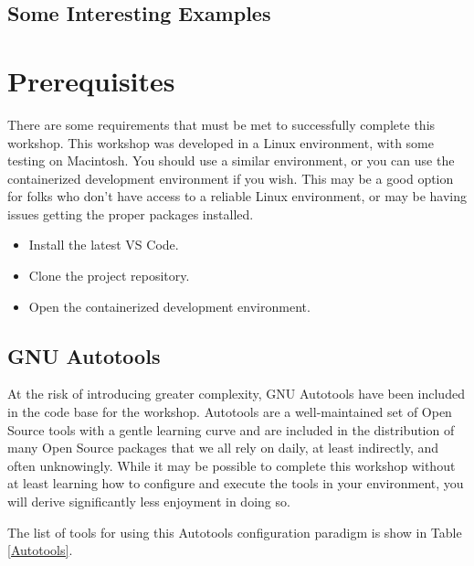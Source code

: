 \subsection{\label{sec:interesting}Some Interesting Examples}

\section{\label{sec:preparation}Prerequisites}

\justifying
There are some requirements that must be met to successfully complete this workshop. This workshop was developed in a Linux environment, with some testing on Macintosh. You should use a similar environment, or you can use the containerized development environment if you wish. This may be a good option for folks who don't have access to a reliable Linux environment, or may be having issues getting the proper packages installed.

\begin{raggedright}
	\begin{itemize}
		\item Install the latest VS Code.
		\item Clone the project repository.
		\item Open the containerized development environment.
	\end{itemize}
\end{raggedright}
\vspace{2mm}

\subsection{\label{sec:autotools}GNU Autotools}

\justifying
At the risk of introducing greater complexity, GNU Autotools have been included in the code base for the workshop. Autotools
are a well-maintained set of Open Source tools with a gentle learning curve and are included in the distribution of many Open
Source packages that we all rely on daily, at least indirectly, and often unknowingly. While it may be possible to complete this workshop
without at least learning how to configure and execute the tools in your environment, you will derive significantly less enjoyment
in doing so.
\vspace{2mm}

\justifying
The list of tools for using this Autotools configuration paradigm is show in Table \ref{Autotools}.
\vspace{2mm}

